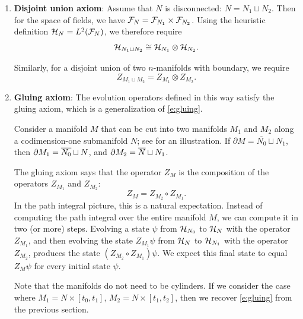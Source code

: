\begin{enumerate}
  	\item {\bf Disjoint union axiom}: Assume that $N$ is disconnected:
      $N=N_1\sqcup N_2$. Then for the space of fields, we have
      $\mathcal{F}_{N}=\mathcal{F}_{N_1}\times \mathcal{F}_{N_2}$. Using the heuristic definition
      $\mathcal{H}_N=L^2(\mathcal{F}_N)$, we therefore require
    \begin{equation}\label{e:qft-axiom1a}
      \mathcal{H}_{N_1\sqcup N_2} \cong \mathcal{H}_{N_1}\otimes \mathcal{H}_{N_2}.
    \end{equation}
  
    Similarly, for a disjoint union of two $n$-manifolds with boundary, we 
    require
    \begin{equation}\label{e:qft-axiom1b}
      Z_{M_1\sqcup M_2} = Z_{M_1}\otimes Z_{M_2}.
    \end{equation}



  \item {\bf Gluing axiom}: The evolution operators defined in this way satisfy
    the gluing axiom, which is a generalization of \eqref{e:gluing}.

    Consider a manifold $M$ that can be cut into two manifolds $M_1$ and $M_2$
    along a codimension-one submanifold $N$; see  for an
    illustration. If $\partial M = \overline{N_0} \sqcup N_1$, then
    $\partial M_{1} = \overline{N_0} \sqcup N$, and
    $\partial M_{2} = \overline{N} \sqcup N_1$.

    The gluing axiom says that the operator $Z_{M}$ is the composition of the
    operators $Z_{M_1}$ and $Z_{M_2}$:
    \begin{equation}\label{e:gluing-axiom}
    	Z_{M} = Z_{M_2} \circ Z_{M_1}.
    \end{equation}
	In the path integral picture, this is a natural expectation. Instead of
	computing the path integral over the entire manifold $M$, we can compute it
	in two (or more) steps. Evolving a state $\psi$ from $\mathcal{H}_{N_0}$ to
	$\mathcal{H}_{N}$ with the operator $Z_{M_1}$, and then evolving the state
	$Z_{M_1} \psi$ from $\mathcal{H}_{N}$ to $\mathcal{H}_{N_1}$ with the operator
	$Z_{M_2}$, produces the state $(Z_{M_2} \circ Z_{M_1}) \psi$. We expect this
	final state to equal $Z_M \psi$ for every initial state $\psi$.

      Note that the manifolds do not need to be cylinders. If we consider the
      case where $M_1=N\times [t_0,t_1]$, $M_2=N\times [t_1,t_2]$, then we
      recover \eqref{e:gluing} from the previous section.
    \begin{figure}[ht]
    	\centering


\end{figure}
\end{enumerate}
